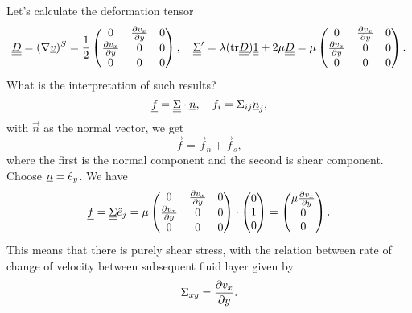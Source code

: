 \documentclass[../main.tex]{subfiles}
\begin{document}
  Let's calculate the deformation tensor
  \begin{displaymath}
    \underline{\underline{{D}}} = (\nabla \underline{v})^S = \frac{1}{2} \begin{pmatrix}
      0 & \frac{\partial v_x}{\partial y} & 0 \\
       \frac{\partial v_x}{\partial y} & 0 & 0 \\
       0 & 0 & 0
    \end{pmatrix}, \quad \underline{\underline{{\Sigma}}}' = \lambda (\textrm{tr} \underline{\underline{{D}}}) \underline{\underline{{1}}} + 2 \mu \underline{\underline{{D}}} 
    = \mu \begin{pmatrix}
      0 & \frac{\partial v_x}{\partial y} & 0\\
      \frac{\partial v_x}{\partial y} & 0 & 0\\
      0 & 0 & 0
    \end{pmatrix}.
  \end{displaymath}
  What is the interpretation of such results?
  \begin{displaymath}
    \underline{f}= \underline{\underline{{\Sigma}}} \cdot \underline{n}, \quad f_i = \Sigma_{ij} \underline{n}_j, 
  \end{displaymath}
  with $\vec n$ as the normal vector, we get
  \begin{displaymath}
    \vec f = \vec f_n + \vec f_s,
  \end{displaymath}
  where the first is the normal component and the second is shear component.
  Choose $\underline{n} = \hat{e}_y$. We have
  \begin{displaymath}
    \underline{f} = \underline{\underline{{ \Sigma}}} \hat e_j = \mu \begin{pmatrix}
      0 & \frac{\partial v_x}{\partial y} & 0\\
      \frac{\partial v_x}{\partial y} & 0 & 0\\
      0 & 0 & 0
    \end{pmatrix} \cdot \begin{pmatrix}
      0 \\ 
      1 \\
      0
    \end{pmatrix} = \begin{pmatrix}
      \mu \frac{\partial v_x}{\partial y}\\
      0\\
      0
    \end{pmatrix}.
  \end{displaymath}
  This means that there is purely shear stress, with the relation between rate of change of velocity 
  between subsequent fluid layer given by
  \begin{displaymath}
    \Sigma_{xy} = \frac{\partial v_x}{\partial y}.
  \end{displaymath}
  
\end{document}
